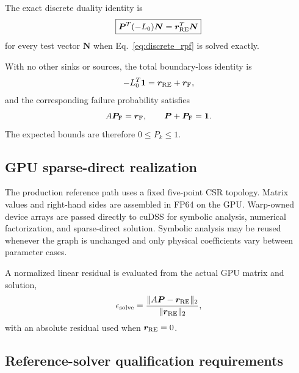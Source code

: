 \documentclass[11pt]{article}
\newcommand{\Pvec}{\bm P}
\newcommand{\Nvec}{\bm N}
\newcommand{\rRE}{\bm r_{\rm RE}}
\newcommand{\rF}{\bm r_{\rm F}}
\begin{document}
The exact discrete duality identity is
\begin{equation}
 \boxed{
 \Pvec^T(-L_0)\Nvec=\rRE^T\Nvec
 }
 \label{eq:duality}
\end{equation}
for every test vector $\Nvec$ when Eq.~\eqref{eq:discrete_rpf} is solved exactly.

With no other sinks or sources, the total boundary-loss identity is
\begin{equation}
 -L_0^T\bm 1=\rRE+\rF,
 \label{eq:escape_identity}
\end{equation}
and the corresponding failure probability satisfies
\begin{equation}
 A\bm P_{\rm F}=\rF,
 \qquad
 \Pvec+\bm P_{\rm F}=\bm1.
 \label{eq:partition}
\end{equation}
The expected bounds are therefore $0\le P_k\le1$.

\subsection{GPU sparse-direct realization}

The production reference path uses a fixed five-point CSR topology.  Matrix values and
right-hand sides are assembled in FP64 on the GPU.  Warp-owned device arrays are passed
directly to cuDSS for symbolic analysis, numerical factorization, and sparse-direct
solution.  Symbolic analysis may be reused whenever the graph is unchanged and only
physical coefficients vary between parameter cases.

A normalized linear residual is evaluated from the actual GPU matrix and solution,
\begin{equation}
 \epsilon_{\rm solve}
 =\frac{\|A\Pvec-\rRE\|_2}{\|\rRE\|_2},
 \label{eq:linear_residual}
\end{equation}
with an absolute residual used when $\rRE=0$.

\subsection{Reference-solver qualification requirements}
\label{sec:fv_qualification}
\end{document}
